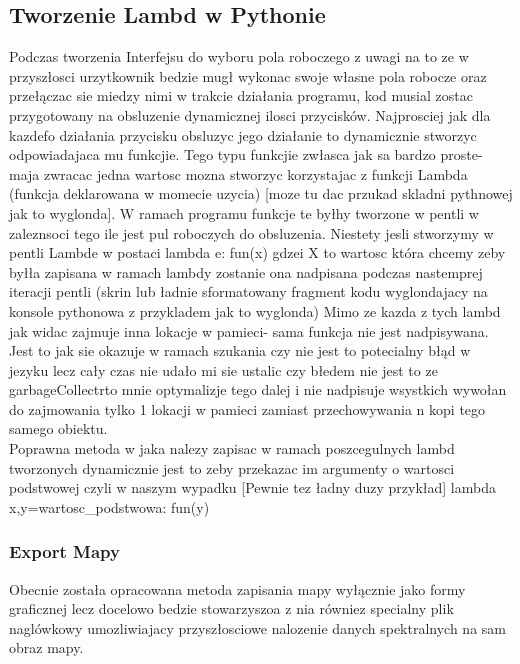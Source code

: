 \documentclass[11pt,a4paper]{article}
\begin{document}
    \subsection{Tworzenie Lambd w Pythonie}
    \hspace{1cm} Podczas tworzenia Interfejsu do wyboru pola roboczego z uwagi na to ze w przyszłosci urzytkownik bedzie mugł wykonac swoje własne pola robocze oraz przełączac sie miedzy nimi w trakcie działania programu, kod musial zostac przygotowany na obsluzenie dynamicznej ilosci przycisków. Najprosciej jak dla kazdefo działania przycisku obsluzyc jego działanie to dynamicznie stworzyc odpowiadajaca mu funkcjie. Tego typu funkcjie zwłasca jak sa bardzo proste- maja zwracac jedna wartosc mozna stworzyc korzystajac z funkcji Lambda (funkcja deklarowana w momecie uzycia) [moze tu dac przukad skladni pythnowej jak to wyglonda]. W ramach programu funkcje te byłhy tworzone w pentli w zaleznsoci tego ile jest pul roboczych do obsluzenia. Niestety jesli stworzymy w pentli Lambde w postaci lambda e: fun(x) gdzei X to wartosc która chcemy zeby byłła zapisana w ramach lambdy zostanie ona nadpisana podczas nastemprej iteracji pentli (skrin lub ładnie sformatowany fragment kodu wyglondajacy na konsole pythonowa z przykladem jak to wyglonda)
    Mimo ze kazda z tych lambd jak widac zajmuje inna lokacje w pamieci- sama funkcja nie jest nadpisywana. Jest to jak sie okazuje w ramach szukania czy nie jest to potecialny błąd w jezyku lecz cały czas nie udało mi sie ustalic czy błedem nie jest to ze garbageCollectrto mnie optymalizje tego dalej i nie nadpisuje wsystkich wywołan do zajmowania tylko 1 lokacji w pamieci zamiast przechowywania n kopi tego samego obiektu.\\
    \hspace{1cm} Poprawna metoda w jaka nalezy zapisac w ramach poszcegulnych lambd tworzonych dynamicznie jest to zeby przekazac im argumenty o wartosci podstwowej czyli w naszym wypadku [Pewnie tez ładny duzy przykład] lambda x,y=wartosc_podstwowa: fun(y)

    \subsubsection{Export Mapy}
    \hspace{1cm} Obecnie została opracowana metoda zapisania mapy wyłącznie jako formy graficznej lecz docelowo bedzie stowarzyszoa z nia równiez specialny plik naglówkowy umozliwiajacy przyszłosciowe nalozenie danych spektralnych na sam obraz mapy.
\end{document}
